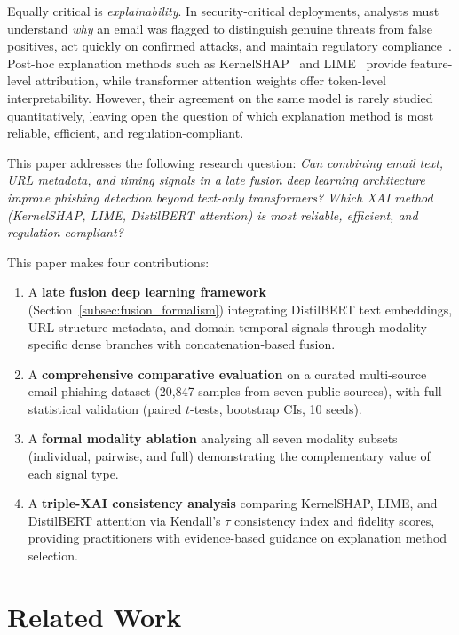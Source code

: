 \documentclass[conference]{IEEEtran}
\begin{document}
Equally critical is \emph{explainability}. In security-critical deployments,
analysts must understand \emph{why} an email was flagged to distinguish genuine
threats from false positives, act quickly on confirmed attacks, and maintain
regulatory compliance~\cite{alotaibi2025}. Post-hoc explanation methods
such as KernelSHAP~\cite{lundberg2017} and LIME~\cite{ribeiro2016} provide
feature-level attribution, while transformer attention weights offer
token-level interpretability. However, their agreement on the same model
is rarely studied quantitatively, leaving open the question of which
explanation method is most reliable, efficient, and regulation-compliant.

This paper addresses the following research question: \emph{Can combining
email text, URL metadata, and timing signals in a late fusion deep learning
architecture improve phishing detection beyond text-only transformers? Which
XAI method (KernelSHAP, LIME, DistilBERT attention) is most
reliable, efficient, and regulation-compliant?}

This paper makes four contributions:
\begin{enumerate}[leftmargin=*,itemsep=2pt]
  \item A \textbf{late fusion deep learning framework} (Section~\ref{subsec:fusion_formalism}) integrating DistilBERT text embeddings, URL structure metadata, and domain temporal signals through modality-specific dense branches with concatenation-based fusion.
  \item A \textbf{comprehensive comparative evaluation} on a curated multi-source email phishing dataset (20,847 samples from seven public sources), with full statistical validation (paired $t$-tests, bootstrap CIs, 10 seeds).
  \item A \textbf{formal modality ablation} analysing all seven modality subsets (individual, pairwise, and full) demonstrating the complementary value of each signal type.
  \item A \textbf{triple-XAI consistency analysis} comparing KernelSHAP, LIME, and DistilBERT attention via Kendall's $\tau$ consistency index and fidelity scores, providing practitioners with evidence-based guidance on explanation method selection.
\end{enumerate}

\section{Related Work}
\label{sec:related}
\end{document}
